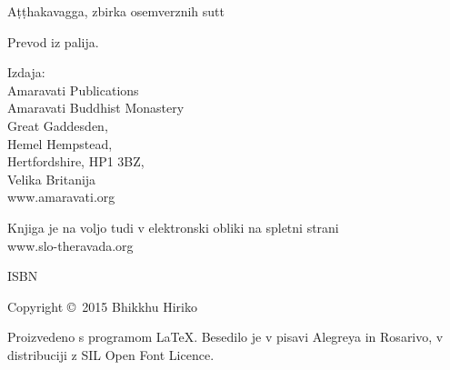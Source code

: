 \cleartoverso

\thispagestyle{empty}

{\small\setlength{\parskip}{0.8em}\setlength{\parindent}{0em}%
{\centering

Aṭṭhakavagga, zbirka osemverznih sutt

Prevod iz palija.

Izdaja:\\
Amaravati Publications\\
Amaravati Buddhist Monastery\\
Great Gaddesden,\\
Hemel Hempstead,\\
Hertfordshire, HP1 3BZ,\\
Velika Britanija\\
www.amaravati.org


Knjiga je na voljo tudi v elektronski obliki na spletni strani\\
www.slo-theravada.org

ISBN \theISBN

Copyright \copyright\ 2015 Bhikkhu Hiriko

\vfill

Proizvedeno s programom {\selectfont\LaTeX}. Besedilo je v pisavi Alegreya in Rosarivo, v distribuciji z SIL Open Font Licence.

\theEditionInfo

\thePrintedByInfo

}}
